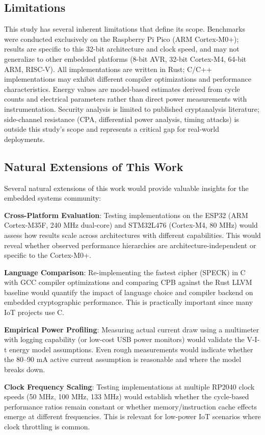 \documentclass[12pt]{report}
\begin{document}
\subsection*{Limitations}
This study has several inherent limitations that define its scope. Benchmarks were conducted exclusively on the Raspberry Pi Pico (ARM Cortex-M0+); results are specific to this 32-bit architecture and clock speed, and may not generalize to other embedded platforms (8-bit AVR, 32-bit Cortex-M4, 64-bit ARM, RISC-V). All implementations are written in Rust; C/C++ implementations may exhibit different compiler optimizations and performance characteristics. Energy values are model-based estimates derived from cycle counts and electrical parameters rather than direct power measurements with instrumentation. Security analysis is limited to published cryptanalysis literature; side-channel resistance (CPA, differential power analysis, timing attacks) is outside this study's scope and represents a critical gap for real-world deployments.

\subsection*{Natural Extensions of This Work}
Several natural extensions of this work would provide valuable insights for the embedded systems community:

\textbf{Cross-Platform Evaluation}: Testing implementations on the ESP32 (ARM Cortex-M35F, 240 MHz dual-core) and STM32L476 (Cortex-M4, 80 MHz) would assess how results scale across architectures with different capabilities. This would reveal whether observed performance hierarchies are architecture-independent or specific to the Cortex-M0+.

\textbf{Language Comparison}: Re-implementing the fastest cipher (SPECK) in C with GCC compiler optimizations and comparing CPB against the Rust LLVM baseline would quantify the impact of language choice and compiler backend on embedded cryptographic performance. This is practically important since many IoT projects use C.

\textbf{Empirical Power Profiling}: Measuring actual current draw using a multimeter with logging capability (or low-cost USB power monitors) would validate the V-I-t energy model assumptions. Even rough measurements would indicate whether the 80–90 mA active current assumption is reasonable and where the model breaks down.

\textbf{Clock Frequency Scaling}: Testing implementations at multiple RP2040 clock speeds (50 MHz, 100 MHz, 133 MHz) would establish whether the cycle-based performance ratios remain constant or whether memory/instruction cache effects emerge at different frequencies. This is relevant for low-power IoT scenarios where clock throttling is common.
\end{document}
